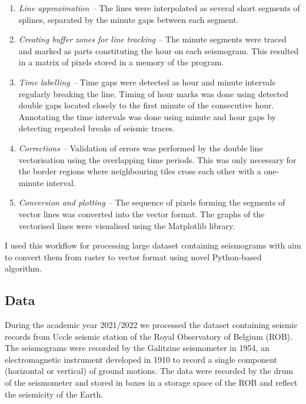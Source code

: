 \documentclass[a4paper,english,12pt]{article}
\begin{document}
\begin{enumerate}
	\subitem \emph{Edge detection -- } The edges of seismic traces (start and end points) were detected according to the seismogram structure: minute and hour time gaps made by the drum of the seismometer which signify the ends of the line segments. 
	\subitem \emph{Vectorisation -- } Each tile on the image was digitised by an algorithm configured as a loop of code processing the image. This resulted in digitised segments visualised as vector lines on the seismograms, coloured randomly.  	
	\item \emph{Line approximation --} The lines were interpolated as several short segments of splines, separated by the minute gaps between each segment. 	
	\item \emph{Creating buffer zones for line tracking -- } The minute segments were traced and marked as parts constituting the hour on each seismogram. This resulted in a matrix of pixels stored in a memory of the program.	
	\item \emph{Time labelling --} Time gaps were detected as hour and minute intervals regularly breaking the line.  Timing of hour marks was done using detected double gaps located closely to the first minute of the consecutive hour. Annotating the time intervals was done using minute and hour gaps by detecting repeated breaks of seismic traces.	
	\item \emph{Corrections --} Validation of errors was performed by the double line vectorisation using the overlapping time periods. This was only necessary for the border regions where neighbouring tiles cross each other with a one-minute interval.	
	\item \emph{Conversion and plotting --} The sequence of pixels forming the segments of vector lines was converted  into the vector format. The graphs of the vectorised lines were visualised using the Matplotlib library.
\end{enumerate}

I used this workflow for processing large dataset containing seismograms with aim to convert them from raster to vector format using novel Python-based algorithm. 

\subsection{Data}
During the academic year 2021/2022 we processed the dataset containing seismic records from Uccle seismic station of the Royal Observatory of Belgium (ROB). The seismograms were recorded by the Galitzine seismometer in 1954, an electromagnetic instrument developed in 1910 to record a single component (horizontal or vertical) of ground motions. The data were recorded by the drum of the seismometer and stored in boxes in a storage space of the ROB and reflect the seismicity of the Earth.
\end{document}
